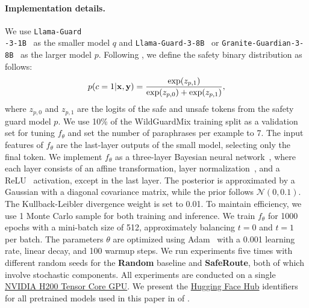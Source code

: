 \paragraph{Implementation details.} 
We use \texttt{Llama-Guard} \\ \texttt{-3-1B}~\citep{metallamaguard3} as the smaller model \( q \) and \texttt{Llama-Guard-3-8B}~\citep{metallamaguard3} or \texttt{Granite-Guardian-3-8B}~\citep{granite-guardian} as the larger model \( p \). Following \citet{liu2024calibration}, we define the safety binary distribution as follows:
\begin{align*}
p(c=1|{\mathbf{x}},{\mathbf{y}}) = \frac{\exp(z_{p,1})}{\exp(z_{p,0}) + \exp(z_{p,1})},
\end{align*}
where \( z_{p,0} \) and \( z_{p,1} \) are the logits of the safe and unsafe tokens from the safety guard model $p$. We use 10\% of the WildGuardMix training split as a validation set for tuning \( f_\theta \) and set the number of paraphrases per example to 7. The input features of \( f_\theta \) are the last-layer outputs of the small model, selecting only the final token.
We implement \( f_\theta \) as a three-layer Bayesian neural network~\citep{blundell2015weight}, where each layer consists of an affine transformation, layer normalization~\cite{ba2016layer}, and a ReLU~\citep{Nair2010RectifiedLU} activation, except in the last layer. The posterior is approximated by a Gaussian with a diagonal covariance matrix, while the prior follows \( \mathcal{N}(0, 0.1) \). The Kullback-Leibler divergence weight is set to 0.01.
To maintain efficiency, we use 1 Monte Carlo sample for both training and inference. We train \( f_\theta \) for 1000 epochs with a mini-batch size of 512, approximately balancing \( t = 0 \) and \( t = 1 \) per batch. The parameters \( \theta \) are optimized using Adam~\cite{kingma2014adam} with a 0.001 learning rate, linear decay, and 100 warmup steps.
We run experiments five times with different random seeds for the \textbf{Random} baseline and \textbf{SafeRoute}, both of which involve stochastic components. All experiments are conducted on a single \href{https://www.nvidia.com/en-us/data-center/h200/}{NVIDIA H200 Tensor Core GPU}.
We present the \href{https://huggingface.co/docs/hub/index}{Hugging Face Hub} identifiers for all pretrained models used in this paper in  of .




